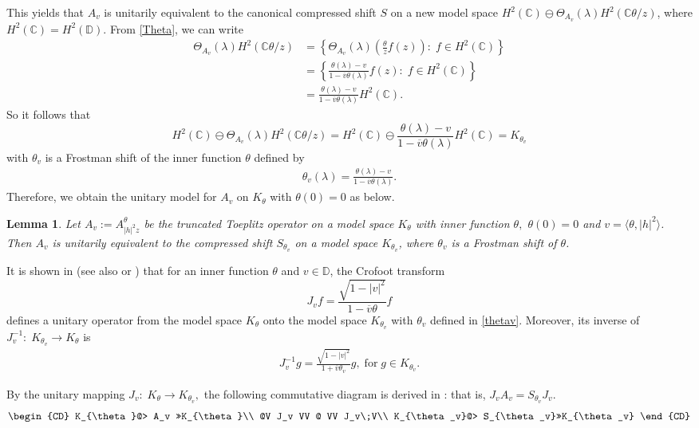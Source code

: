 \documentclass[12pt,reqno]{amsart}
\newtheorem{lem}[thm]{Lemma}
\theoremstyle{definition}
\theoremstyle{remark}
\numberwithin{equation}{section}
\newcommand{\la}{\langle}
\newcommand{\ra}{\rangle}
\newcommand{\ol}{\overline}
\begin{document}
This yields that $A_v$ is unitarily equivalent to the canonical compressed shift $S$ on a new model space  $ H^2(\mathbb{C})\ominus \Theta_{A_v}(\lambda) H^2(\mathbb{C}\theta/z)$, where  $H^2(\mathbb{C})=H^2(\mathbb{D}).$ From \eqref{Theta}, we can write \begin{align*}\Theta_{A_v}(\lambda) H^2(\mathbb{C}\theta/z)&=
\left\{\Theta_{A_v}(\lambda)\left(\frac{\theta}{z}f(z)\right):\;f\in H^2(\mathbb{C})\right\}\\&=\left\{
\frac{\theta(\lambda)-v}{1-\ol{v}\theta(\lambda)}f(z):\;f\in H^2(\mathbb{C})\right\}\\&=
\frac{\theta(\lambda)-v}{1-\ol{v}\theta(\lambda)}H^2(\mathbb{C}).\end{align*} So it follows that  $$ H^2(\mathbb{C})\ominus \Theta_{A_v}(\lambda) H^2(\mathbb{C}\theta/z)=H^2(\mathbb{C})\ominus \frac{\theta(\lambda)-v}{1-\ol{v}\theta(\lambda)}H^2(\mathbb{C})
 =K_{\theta_v}$$ with $\theta_v$  is a Frostman shift of the inner function $\theta$ defined by \begin{align}\theta_v(\lambda)=\frac{\theta(\lambda)-v}
 {1-\ol{v}\theta(\lambda)}.\label{thetav}\end{align}
Therefore, we obtain the unitary model for $A_v$  on $K_\theta$ with $\theta(0)=0$ as below.

\begin{lem} \label{uni-model} Let $A_v:=A_{|h|^2z}^\theta$ be the truncated Toeplitz operator on a model space $K_\theta$ with  inner function $\theta,$ $\theta(0)=0$ and $v=\la \theta, |h|^2\ra$. Then $A_v$ is unitarily equivalent to the compressed shift $S_{\theta_v}$ on a model space $K_{\theta_v}$, where $\theta_v$ is a Frostman shift of $\theta$. \end{lem}


It is shown in \cite{crofoot} (see also  \cite[Proposition 4.3]{CGRW} or \cite[Theorem 13.1]{Sarason1}) that for an inner function \( \theta\) and \(v \in \mathbb{D} \), the Crofoot transform
$$
J_v f = \frac{\sqrt{1 - |v|^2}}{1 - \ol{v}\theta} f
$$
defines a unitary operator from the model space \( K_\theta \) onto the model space \( K_{\theta_v} \) with $\theta_v$ defined in \eqref{thetav}.  Moreover,  its inverse of $J_v^{-1}:\;K_{\theta_v}\rightarrow K_\theta$ is \begin{align}J_v^{-1}g=\frac{\sqrt{1-|v|^2}}{1+\ol{v}\theta_v}g, \;\mbox{for}\;g\in K_{\theta_v}.\label{inver}\end{align}

By the unitary mapping $J_v:\;K_\theta\rightarrow K_{\theta_v},$  the following commutative diagram is derived in \cite[Lemma 13.3]{Sarason1}: that is, $J_vA_v=S_{\theta_v}J_v$.
\begin{align}\begin{CD}
K_{\theta}@> A_v >>K_{\theta}\\
@V J_v  VV @ VV J_v\;V\\
K_{\theta_v}@> S_{\theta_v}>>K_{\theta_v}
\end{CD}\label{AJS} \end{align}
\end{document}
